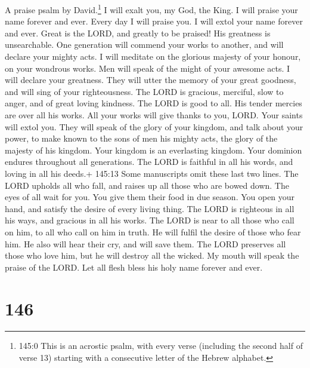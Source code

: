 A praise psalm by David.\footnote{145:0 This is an acrostic psalm, with
  every verse (including the second half of verse 13) starting with a
  consecutive letter of the Hebrew alphabet.}  I will exalt
you, my God, the King. I will praise your name forever and ever.
 Every day I will praise you. I will extol your name forever
and ever.  Great is the LORD, and greatly to be praised! His
greatness is unsearchable.  One generation will commend your
works to another, and will declare your mighty acts.  I will
meditate on the glorious majesty of your honour, on your wondrous works.
 Men will speak of the might of your awesome acts. I will
declare your greatness.  They will utter the memory of your
great goodness, and will sing of your righteousness.  The
LORD is gracious, merciful, slow to anger, and of great loving kindness.
 The LORD is good to all. His tender mercies are over all
his works.  All your works will give thanks to you, LORD.
Your saints will extol you.  They will speak of the glory
of your kingdom, and talk about your power,  to make known
to the sons of men his mighty acts, the glory of the majesty of his
kingdom.  Your kingdom is an everlasting kingdom. Your
dominion endures throughout all generations. The LORD is faithful in all
his words, and loving in all his deeds.+ 145:13 Some manuscripts omit
these last two lines.  The LORD upholds all who fall, and
raises up all those who are bowed down.  The eyes of all
wait for you. You give them their food in due season.  You
open your hand, and satisfy the desire of every living thing.
 The LORD is righteous in all his ways, and gracious in all
his works.  The LORD is near to all those who call on him,
to all who call on him in truth.  He will fulfil the desire
of those who fear him. He also will hear their cry, and will save them.
 The LORD preserves all those who love him, but he will
destroy all the wicked.  My mouth will speak the praise of
the LORD. Let all flesh bless his holy name forever and ever.

\hypertarget{section-138}{%
\section{146}\label{section-138}}

